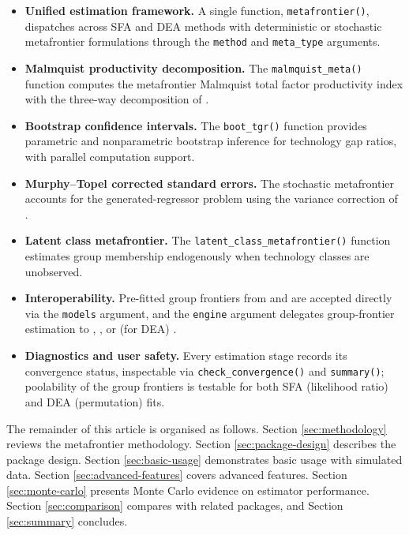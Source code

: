 \begin{itemize}
\tightlist
\item
  \textbf{Unified estimation framework.} A single function, \texttt{metafrontier()},
  dispatches across SFA and DEA methods with deterministic or stochastic
  metafrontier formulations through the \texttt{method} and \texttt{meta\_type} arguments.
\item
  \textbf{Malmquist productivity decomposition.} The \texttt{malmquist\_meta()} function
  computes the metafrontier Malmquist total factor productivity index with
  the three-way decomposition of \citet{odonnell2008}.
\item
  \textbf{Bootstrap confidence intervals.} The \texttt{boot\_tgr()} function provides
  parametric and nonparametric bootstrap inference for technology gap ratios,
  with parallel computation support.
\item
  \textbf{Murphy--Topel corrected standard errors.} The stochastic metafrontier
  accounts for the generated-regressor problem using the variance correction
  of \citet{murphy1985}.
\item
  \textbf{Latent class metafrontier.} The \texttt{latent\_class\_metafrontier()} function
  estimates group membership endogenously when technology classes are
  unobserved.
\item
  \textbf{Interoperability.} Pre-fitted group frontiers from  and
   are accepted directly via the \texttt{models} argument, and
  the \texttt{engine} argument delegates group-frontier estimation to
  , , or (for DEA) .
\item
  \textbf{Diagnostics and user safety.} Every estimation stage records its
  convergence status, inspectable via \texttt{check\_convergence()} and
  \texttt{summary()}; poolability of the group frontiers is testable for both SFA
  (likelihood ratio) and DEA (permutation) fits.
\end{itemize}

The remainder of this article is organised as follows. Section \ref{sec:methodology} reviews the
metafrontier methodology. Section \ref{sec:package-design} describes the package design. Section \ref{sec:basic-usage}
demonstrates basic usage with simulated data. Section \ref{sec:advanced-features} covers advanced
features. Section \ref{sec:monte-carlo} presents Monte Carlo evidence on estimator performance.
Section \ref{sec:comparison} compares  with related packages, and Section \ref{sec:summary}
concludes.

